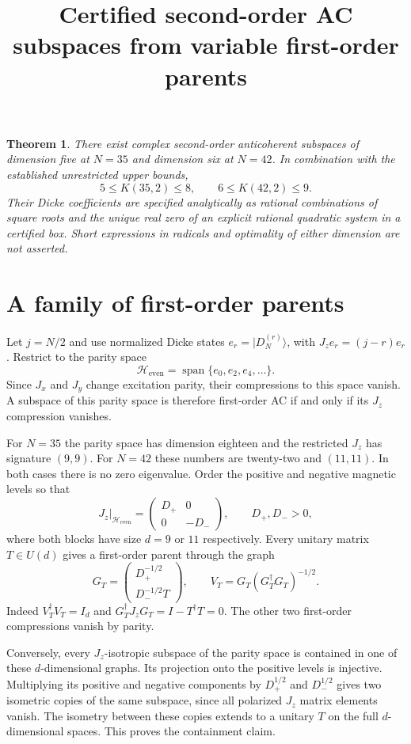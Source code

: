 \documentclass[11pt]{article}
\newtheorem{theorem}{Theorem}
\begin{document}
\title{Certified second-order AC subspaces from variable first-order parents}
\author{}\date{}\maketitle

\begin{theorem}
There exist complex second-order anticoherent subspaces of dimension five
at $N=35$ and dimension six at $N=42$. In combination with the established
unrestricted upper bounds,
\[
 \boxed{5\le K(35,2)\le8,\qquad6\le K(42,2)\le9.}
\]
Their Dicke coefficients are specified analytically as rational combinations
of square roots and the unique real zero of an explicit rational quadratic
system in a certified box. Short expressions in radicals and optimality
of either dimension are not asserted.
\end{theorem}

\section{A family of first-order parents}
Let $j=N/2$ and use normalized Dicke states $e_r=|D_N^{(r)}\rangle$, with
$J_ze_r=(j-r)e_r$. Restrict to the parity space
\[
 \mathcal H_{\mathrm{even}}=\operatorname{span}\{e_0,e_2,e_4,\ldots\}.
\]
Since $J_x$ and $J_y$ change excitation parity, their compressions to this
space vanish. A subspace of this parity space is therefore first-order AC
if and only if its $J_z$ compression vanishes.

For $N=35$ the parity space has dimension eighteen and the restricted
$J_z$ has signature $(9,9)$. For $N=42$ these numbers are twenty-two and
$(11,11)$. In both cases there is no zero eigenvalue. Order the positive
and negative magnetic levels so that
\[
 J_z|_{\mathcal H_{\mathrm{even}}}=
 \begin{pmatrix}D_+&0\\0&-D_-\end{pmatrix},\qquad D_+,D_->0,
\]
where both blocks have size $d=9$ or $11$ respectively. Every unitary
matrix $T\in U(d)$ gives a first-order parent through the graph
\[
 G_T=\begin{pmatrix}D_+^{-1/2}\\D_-^{-1/2}T\end{pmatrix},
 \qquad
 V_T=G_T(G_T^\dagger G_T)^{-1/2}.
\]
Indeed $V_T^\dagger V_T=I_d$ and $G_T^\dagger J_zG_T=I-T^\dagger T=0$.
The other two first-order compressions vanish by parity.

Conversely, every $J_z$-isotropic subspace of the parity space is contained
in one of these $d$-dimensional graphs. Its projection onto the positive
levels is injective. Multiplying its positive and negative components by
$D_+^{1/2}$ and $D_-^{1/2}$ gives two isometric copies of the same subspace,
since all polarized $J_z$ matrix elements vanish. The isometry between
these copies extends to a unitary $T$ on the full $d$-dimensional spaces.
This proves the containment claim.
\end{document}
